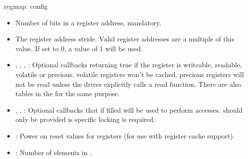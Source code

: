 \begin{frame}[fragile]{regmap: config}
  \begin{itemize}
  \item {} Number of bits in a register address, mandatory.
  \item {} The register address stride. Valid register
    addresses are a multiple of this value. If set to 0, a value of 1
    will be used.
  \item {}, ,
    , : Optional callbacks
    returning true if the register is writeable, readable, volatile or
    precious. volatile registers won't be cached. precious registers
    will not be read unless the driver explicitly calls a read
    function. There are also tables in the 
    for the same purpose.
  \item {}, , :
    Optional callbacks that if filled will be used to perform
    accesses.  should only be provided is
    specific locking is required.
  \item {}: Power on reset values for registers (for
    use with register cache support).
  \item {}: Number of elements in
    .
  \end{itemize}
\end{frame}

